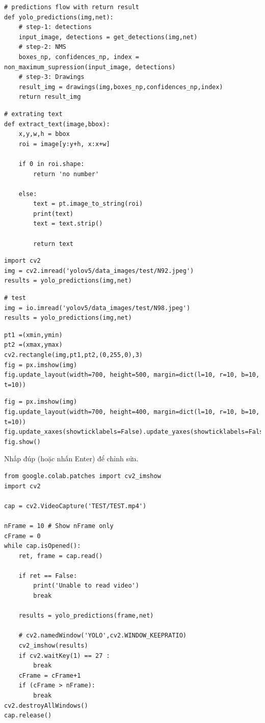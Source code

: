 \documentclass{article}
\begin{document}
\begin{verbatim}
# predictions flow with return result
def yolo_predictions(img,net):
    # step-1: detections
    input_image, detections = get_detections(img,net)
    # step-2: NMS
    boxes_np, confidences_np, index = non_maximum_supression(input_image, detections)
    # step-3: Drawings
    result_img = drawings(img,boxes_np,confidences_np,index)
    return result_img
\end{verbatim}

\begin{verbatim}
# extrating text
def extract_text(image,bbox):
    x,y,w,h = bbox
    roi = image[y:y+h, x:x+w]

    if 0 in roi.shape:
        return 'no number'

    else:
        text = pt.image_to_string(roi)
        print(text)
        text = text.strip()

        return text

\end{verbatim}

\begin{verbatim}
import cv2
img = cv2.imread('yolov5/data_images/test/N92.jpeg')
results = yolo_predictions(img,net)
\end{verbatim}

\begin{verbatim}
# test
img = io.imread('yolov5/data_images/test/N98.jpeg')
results = yolo_predictions(img,net)
\end{verbatim}

\begin{verbatim}
pt1 =(xmin,ymin)
pt2 =(xmax,ymax)
cv2.rectangle(img,pt1,pt2,(0,255,0),3)
fig = px.imshow(img)
fig.update_layout(width=700, height=500, margin=dict(l=10, r=10, b=10, t=10))
\end{verbatim}

\begin{verbatim}
fig = px.imshow(img)
fig.update_layout(width=700, height=400, margin=dict(l=10, r=10, b=10, t=10))
fig.update_xaxes(showticklabels=False).update_yaxes(showticklabels=False)
fig.show()
\end{verbatim}

Nhấp đúp (hoặc nhấn Enter) để chỉnh sửa.
\begin{verbatim}
from google.colab.patches import cv2_imshow
import cv2

cap = cv2.VideoCapture('TEST/TEST.mp4')

nFrame = 10 # Show nFrame only
cFrame = 0
while cap.isOpened():
    ret, frame = cap.read()

    if ret == False:
        print('Unable to read video')
        break

    results = yolo_predictions(frame,net)

    # cv2.namedWindow('YOLO',cv2.WINDOW_KEEPRATIO)
    cv2_imshow(results)
    if cv2.waitKey(1) == 27 :
        break
    cFrame = cFrame+1
    if (cFrame > nFrame):
        break
cv2.destroyAllWindows()
cap.release()
\end{verbatim}
\end{document}
